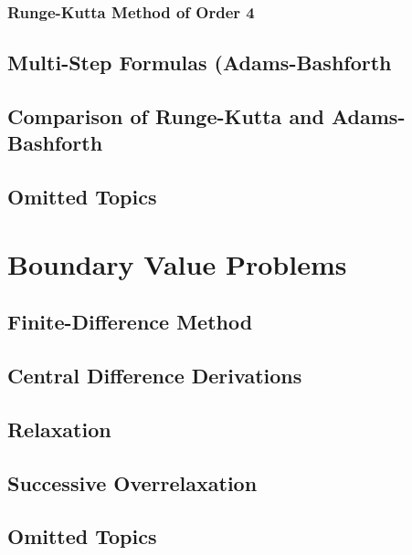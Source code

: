 \subsubsection{Runge-Kutta Method of Order 4}

\subsection{Multi-Step Formulas (Adams-Bashforth}

\subsection{Comparison of Runge-Kutta and Adams-Bashforth}

\subsection{Omitted Topics}

\section{Boundary Value Problems}

\subsection{Finite-Difference Method}

\subsection{Central Difference Derivations}

\subsection{Relaxation}

\subsection{Successive Overrelaxation}

\subsection{Omitted Topics}